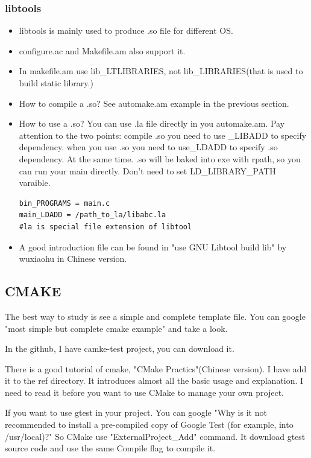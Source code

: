 \documentclass[paper=8.5in:11in, twoside, 12pt, pagesize=pdftex]{book}
\begin{document}
\subsubsection{libtools}
\begin{itemize}
\item libtools is mainly used to produce .so file for different OS.
\item configure.ac and Makefile.am also support it.

\item In makefile.am use lib\_LTLIBRARIES, not lib\_LIBRARIES(that is used to build static library.)

\item How to compile a .so? See automake.am example in the previous section.
\item How to use a .so? You can use .la file directly in you automake.am. Pay attention to the two points: compile .so you need to use \_LIBADD to specify dependency. when you use .so you need to use\_LDADD to specify .so dependency. At the same time. .so will be baked into exe with rpath, so you can run your main directly. Don't need to set LD\_LIBRARY\_PATH varaible.
\begin{verbatim}
bin_PROGRAMS = main.c
main_LDADD = /path_to_la/libabc.la 
#la is special file extension of libtool
\end{verbatim}

\item A good introduction file can be found in "use GNU Libtool build lib" by wuxiaohu in Chinese version.

\end{itemize}

\fi

\subsection{CMAKE}

	The best way to study is see a simple and complete template file. You can google "most simple but complete cmake example" and take a look.  
		
	In the github, I have camke-test project, you can download it.
		
	There is a good tutorial of cmake, "CMake Practics"(Chinese version). I have add it to the ref directory. It introduces almost all the basic usage and explanation. I need to read it before you want to use CMake to manage your own project.
		
	If you want to use gtest in your project. You can google "Why is it not recommended to install a pre-compiled copy of Google Test (for example, into /usr/local)?" So CMake use "ExternalProject\_Add" command. It download gtest source code and use the same Compile flag to compile it. 
		
\end{document}

